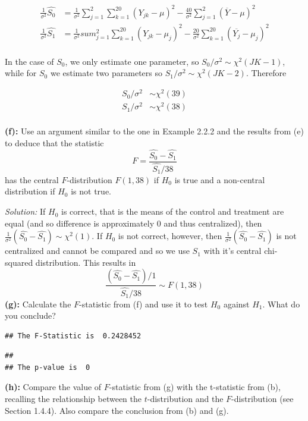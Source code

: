 \documentclass[]{article}
\begin{document}
\begin{align*}
\frac{1}{\sigma^2}\hat{S_0} &= \frac{1}{\sigma^2}\sum_{j=1}^2\sum_{k=1}^{20}(Y_{jk} - \mu)^2 - \frac{40}{\sigma^2}\sum_{j=1}^2(\overline{Y} - \mu)^2\\
\frac{1}{\sigma^2}\hat{S_1} &= \frac{1}{\sigma^2}sum_{j=1}^2\sum_{k=1}^{20}(Y_{jk} - \mu_j)^2 - \frac{20}{\sigma^2}\sum^{20}_{k=1}(\overline{Y_j} - \mu_j)^2 \\
\end{align*}

In the case of \(S_0\), we only estimate one parameter, so
\(S_0/\sigma^2 \sim \chi^2(JK - 1)\), while for \(S_0\) we estimate two
parameters so \(S_1/\sigma^2 \sim \chi^2(JK - 2)\). Therefore

\begin{align*}
S_0/\sigma^2 &\sim \chi^2(39)\\
S_1/\sigma^2 &\sim \chi^2(38)\\
\end{align*}

\textbf{(f):} Use an argument similar to the one in Example 2.2.2 and
the results from (e) to deduce that the statistic \[ 
F = \frac{\hat{S_0} - \hat{S_1}}{\hat{S_1}/38}
\] has the central \(F\)-distribution \(F(1,38)\) if \(H_0\) is true and
a non-central distribution if \(H_0\) is not true.

\emph{Solution: }If \(H_0\) is correct, that is the means of the control
and treatment are equal (and so difference is approximately 0 and thus
centralized), then
\(\frac{1}{\sigma^2}(\hat{S_0} - \hat{S_1}) \sim \chi^2(1)\). If \(H_0\)
is not correct, however, then
\(\frac{1}{\sigma^2}(\hat{S_0} - \hat{S_1})\) is not centralized and
cannot be compared and so we use \(S_1\) with it's central chi-squared
distribution. This results in \[
\dfrac{(\hat{S_0} - \hat{S_1})/1}{\hat{S_1}/38} \sim F(1,38)
\] \textbf{(g):} Calculate the \(F\)-statistic from (f) and use it to
test \(H_0\) against \(H_1\). What do you conclude?

\begin{verbatim}
## The F-Statistic is  0.2428452
\end{verbatim}

\begin{verbatim}
## 
## The p-value is  0
\end{verbatim}

\textbf{(h):} Compare the value of \(F\)-statistic from (g) with the
t-statistic from (b), recalling the relationship between the
\(t\)-distribution and the \(F\)-distribution (see Section 1.4.4). Also
compare the conclusion from (b) and (g).
\end{document}
